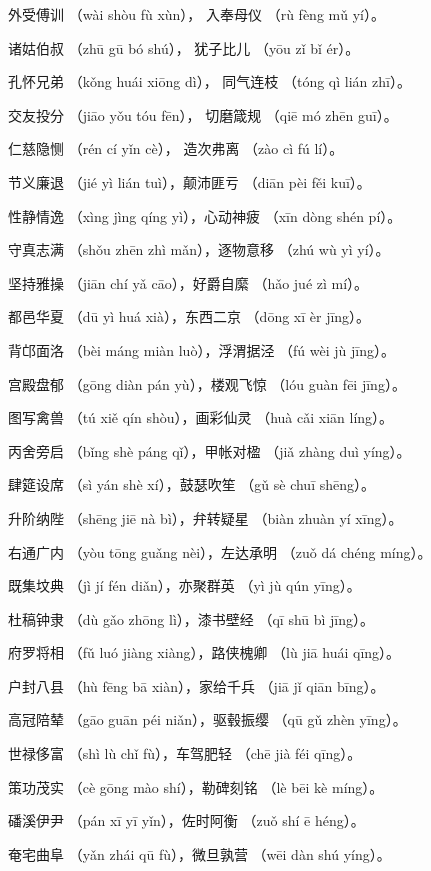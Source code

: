 \documentclass[12pt]{article}%
\begin{document}
\begin{appendices}
\begin{subappendix}
\begin{center}
外受傅训 （wài shòu fù xùn）， 入奉母仪 （rù fèng mǔ yí）。

诸姑伯叔 （zhū gū bó shú）， 犹子比儿 （yōu zǐ bǐ ér）。

孔怀兄弟 （kǒng huái xiōng dì）， 同气连枝 （tóng qì lián zhī）。

交友投分 （jiāo yǒu tóu fēn）， 切磨箴规 （qiē mó zhēn guī）。

仁慈隐恻 （rén cí yǐn cè）， 造次弗离 （zào cì fú lí）。

节义廉退 （jié yì lián tuì），颠沛匪亏 （diān pèi fěi kuī）。

性静情逸 （xìng jìng qíng yì），心动神疲 （xīn dòng shén pí）。

守真志满 （shǒu zhēn zhì mǎn），逐物意移 （zhú wù yì yí）。

坚持雅操 （jiān chí yǎ cāo），好爵自縻 （hǎo jué zì mí）。

都邑华夏 （dū yì huá xià），东西二京 （dōng xī èr jīng）。

背邙面洛 （bèi máng miàn luò），浮渭据泾 （fú wèi jù jīng）。

宫殿盘郁 （gōng diàn pán yù），楼观飞惊 （lóu guàn fēi jīng）。

图写禽兽 （tú xiě qín shòu），画彩仙灵 （huà cǎi xiān líng）。

丙舍旁启 （bǐng shè páng qǐ），甲帐对楹 （jiǎ zhàng duì yíng）。

肆筵设席 （sì yán shè xí），鼓瑟吹笙 （gǔ sè chuī shēng）。

升阶纳陛 （shēng jiē nà bì），弁转疑星 （biàn zhuàn yí xīng）。

右通广内 （yòu tōng guǎng nèi），左达承明 （zuǒ dá chéng míng）。

既集坟典 （jì jí fén diǎn），亦聚群英 （yì jù qún yīng）。

杜稿钟隶 （dù gǎo zhōng lì），漆书壁经 （qī shū bì jīng）。

府罗将相 （fǔ luó jiàng xiàng），路侠槐卿 （lù jiā huái qīng）。

户封八县 （hù fēng bā xiàn），家给千兵 （jiā jǐ qiān bīng）。

高冠陪辇 （gāo guān péi niǎn），驱毂振缨 （qū gǔ zhèn yīng）。

世禄侈富 （shì lù chǐ fù），车驾肥轻 （chē jià féi qīng）。

策功茂实 （cè gōng mào shí），勒碑刻铭 （lè bēi kè míng）。

磻溪伊尹 （pán xī yī yǐn），佐时阿衡 （zuǒ shí ē héng）。

奄宅曲阜 （yǎn zhái qū fù），微旦孰营 （wēi dàn shú yíng）。


\end{center}
\end{subappendix}
\end{appendices}
\end{document}
